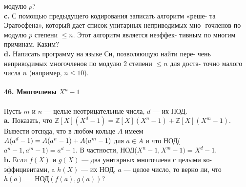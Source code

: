 модулю $p$?\\
\hspace*{10pt}\textbf{c.} С помощью предыдущего кодирования записать алгоритм «реше-\linebreak
та Эратосфена», который дает список унитарных неприводимых мно-\linebreak
гочленов по модулю $p$ степени $\leq n$. Этот алгоритм является неэффек-\linebreak
тивным по многим причинам. Каким?\\
\hspace*{10pt}\textbf{d.} Написать программу на языке Си, позволяющую найти пере-\linebreak
чень неприводимых многочленов по модулю 2 степени $\leq n$ для доста-\linebreak
точно малого числа $n$ (например, $n\leq 10$).
\\
\\
\noindent\textbf{46. Многочлены $X^n-1$}\\\\
\hspace*{10pt}Пусть $m$ и $n$ — целые неотрицательные числа, $d$ — их НОД.\\
\hspace*{10pt}\textbf{a.} Показать, что $\mathbb{Z}[X](X^d - 1) = \mathbb{Z}[X](X^n - 1) + \mathbb{Z}[X](X^m - 1)$.\linebreak
Вывести отсюда, что в любом кольце $A$ имеем $A(a^d - 1) = A(a^n - 1) +\linebreak
A(a^m - 1)$ для $a \in A$ и что НОД($a^n-1, a^m - 1) = a^d - 1$. В частности,\linebreak
НОД($X^n - 1 ,X^m - 1) =X^d - 1$.\\
\hspace*{10pt}\textbf{b.} Если $f(X )$ и $g(X)$ — два унитарных многочлена с целыми ко-\linebreak
эффициентами, a $h(X)$ — их НОД, $a$ — целое число, то верно ли, что\linebreak
$h(a) =$ НОД$(f(a), g(a))$?\pagebreak


